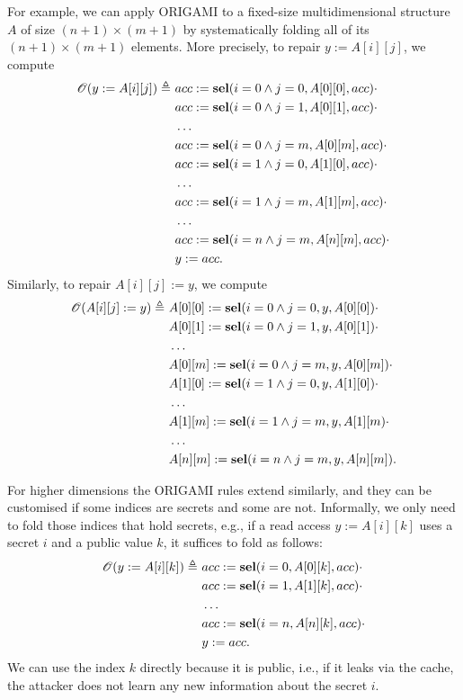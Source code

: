For example, we can apply ORIGAMI to a fixed-size multidimensional structure $A$ of size $(n+1)\times (m+1)$ by systematically folding all of its $(n+1)\times (m+1)$ elements. More precisely, to repair $y:=A[i][j]$, we compute
\begin{align*}
    \mathscr{O}(y:=A[i][j])\triangleq\  
    &acc:=\textbf{sel}(i=0\land j=0,A[0][0],acc)\cdot \\
    &acc:=\textbf{sel}(i=0\land j=1,A[0][1],acc)\cdot \\
    &\ldots\\
    &acc:=\textbf{sel}(i=0\land j=m,A[0][m],acc)\cdot \\
    &acc:=\textbf{sel}(i=1\land j=0,A[1][0],acc)\cdot \\
    &\ldots\\
    &acc:=\textbf{sel}(i=1\land j=m,A[1][m],acc)\cdot \\
    &\ldots\\
    &acc:=\textbf{sel}(i=n\land j=m,A[n][m],acc)\cdot \\
    &y:=acc.
\end{align*}
Similarly, to repair $A[i][j]:=y$, we compute
\begin{align*}
    \mathscr{O}(A[i][j]:=y)\triangleq\  
    &A[0][0]:=\textbf{sel}(i=0\land j=0,y,A[0][0])\cdot \\
    &A[0][1]:=\textbf{sel}(i=0\land j=1,y,A[0][1])\cdot \\
    &\ldots\\
    &A[0][m]:=\textbf{sel}(i=0\land j=m,y,A[0][m])\cdot \\
    &A[1][0]:=\textbf{sel}(i=1\land j=0,y,A[1][0])\cdot \\
    &\ldots\\
    &A[1][m]:=\textbf{sel}(i=1\land j=m,y,A[1][m)\cdot \\
    &\ldots\\
    &A[n][m]:=\textbf{sel}(i=n\land j=m,y,A[n][m]).
\end{align*}

For higher dimensions the ORIGAMI rules extend similarly, and they can be customised if some indices are secrets and some are not. Informally, we only need to fold those indices that hold secrets, e.g., if a read access $y:=A[i][k]$ uses a secret $i$ and a public value $k$, it suffices to fold as follows: 
\begin{align*}
    \mathscr{O}(y:=A[i][k])\triangleq\  
    &acc:=\textbf{sel}(i=0,A[0][k],acc)\cdot \\
    &acc:=\textbf{sel}(i=1,A[1][k],acc)\cdot \\
    &\ldots\\
    &acc:=\textbf{sel}(i=n,A[n][k],acc)\cdot \\
    &y:=acc.
\end{align*}
We can use the index $k$ directly because it is public, i.e., if it leaks via the cache, the attacker does not learn any new information about the secret $i$.

